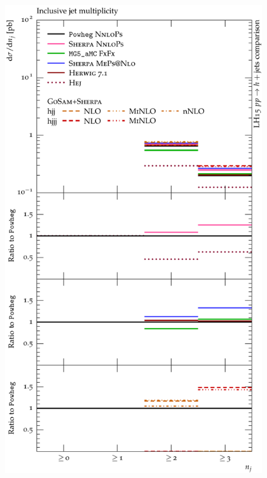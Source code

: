 \begin{figure}[t!]
  \centering
  \begin{minipage}{0.47\textwidth}
    \includegraphics[width=\textwidth]{figures/hjetscomp_u_NJet_incl_30_VBF.pdf}
  \end{minipage}
  \hfill
  \begin{minipage}{0.47\textwidth}
    \lineskip-1.35pt

\end{minipage}
\end{figure}
